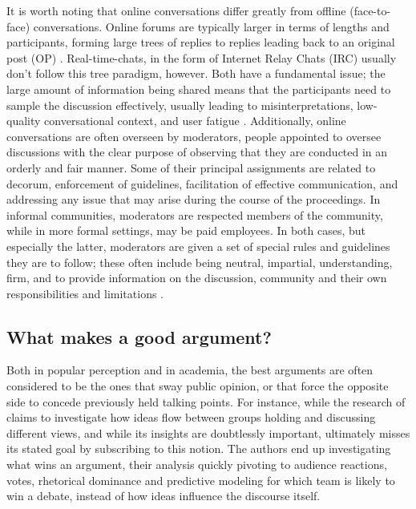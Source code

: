 It is worth noting that online conversations differ greatly from offline (face-to-face) conversations. Online forums are typically larger in terms of lengths and participants, forming large trees of replies to replies leading back to an original post (OP) \cite{boschi2021wordunderstandingsampleonline}. Real-time-chats, in the form of Internet Relay Chats (IRC) usually don't follow this tree paradigm, however. Both have a fundamental issue; the large amount of information being shared means that the participants need to sample the discussion effectively, usually leading to misinterpretations, low-quality conversational context, and user fatigue \cite{boschi2021wordunderstandingsampleonline}. Additionally, online conversations are often overseen by moderators, people appointed to oversee discussions with the clear purpose of observing that they are conducted in an orderly and fair manner. Some of their principal assignments are related to decorum, enforcement of guidelines, facilitation of effective communication, and addressing any issue that may arise during the course of the proceedings. In informal communities, moderators are respected members of the community, while in more formal settings, may be paid employees. In both cases, but especially the latter, moderators are given a set of special rules and guidelines they are to follow; these often include being neutral, impartial, understanding, firm, and to provide information on the discussion, community and their own responsibilities and limitations \cite{Cornell_eRulemaking2017}.

\subsection{What makes a good argument?}
\label{sec:background:good-argument}

Both in popular perception and in academia, the best arguments are often considered to be the ones that sway public opinion, or that force the opposite side to concede previously held talking points. For instance, while the research of \cite{zhang2016-oxford} claims to investigate how ideas flow between groups holding and discussing different views, and while its insights are doubtlessly important, ultimately misses its stated goal by subscribing to this notion. The authors end up investigating what wins an argument, their analysis quickly pivoting to audience reactions, votes, rhetorical dominance and predictive modeling for which team is likely to win a debate, instead of how ideas influence the discourse itself.

